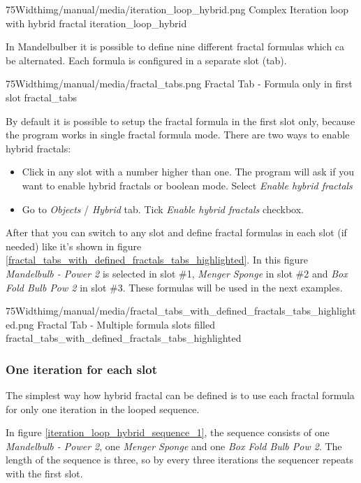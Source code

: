 \simpleImageWithCaption75Width{img/manual/media/iteration_loop_hybrid.png}
{Complex Iteration loop with hybrid fractal}
{iteration_loop_hybrid}

In Mandelbulber it is possible to define nine different fractal formulas which
ca be alternated. Each formula is configured in a separate slot (tab).

\simpleImageWithCaption75Width{img/manual/media/fractal_tabs.png}
{Fractal Tab - Formula only in first slot}
{fractal_tabs}

By default it is possible to setup the fractal formula in the first slot only,
because the program works in single fractal formula mode. There are two ways to
enable hybrid fractals:
\begin{itemize}
	\item Click in any slot with a number higher than one. The program will ask if you want to
	      enable hybrid fractals or boolean mode. Select \emph{Enable hybrid fractals}
	\item Go to \emph{Objects} / \emph{Hybrid} tab. Tick \emph{Enable hybrid fractals} checkbox.
\end{itemize}

After that you can switch to any slot and define fractal formulas in each slot
(if needed) like it's shown in figure \ref{fractal_tabs_with_defined_fractals_tabs_highlighted}.
In this figure \emph{Mandelbulb - Power 2} is selected in slot \#1, \emph{Menger Sponge}
in slot \#2 and \emph{Box Fold Bulb Pow 2} in slot \#3. These formulas will be
used in the next examples.

\simpleImageWithCaption75Width{img/manual/media/fractal_tabs_with_defined_fractals_tabs_highlighted.png}
{Fractal Tab - Multiple formula slots filled}
{fractal_tabs_with_defined_fractals_tabs_highlighted}

\subsubsection{One iteration for each slot}

The simplest way how hybrid fractal can be defined is to use each fractal
formula for only one iteration in the looped sequence.

In figure \ref{iteration_loop_hybrid_sequence_1}, the sequence consists of one \emph{Mandelbulb - Power 2}, one \emph{Menger Sponge} and
one \emph{Box Fold Bulb Pow 2}. The length of the sequence is three, so by every three
iterations the sequencer repeats with the first slot.

